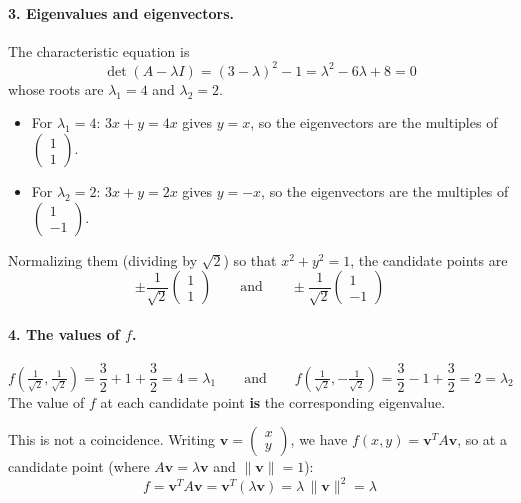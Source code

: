 \documentclass[]{article}
\begin{document}
	\paragraph{3. Eigenvalues and eigenvectors.}
	The characteristic equation is
	$$
	\det(A - \lambda I) = (3-\lambda)^2 - 1 = \lambda^2 - 6\lambda + 8 = 0
	$$
	whose roots are $\lambda_1 = 4$ and $\lambda_2 = 2$.
	\begin{itemize}
		\item For $\lambda_1 = 4$: $3x + y = 4x$ gives $y = x$, so the eigenvectors are the multiples of $\begin{pmatrix} 1 \\ 1 \end{pmatrix}$.
		\item For $\lambda_2 = 2$: $3x + y = 2x$ gives $y = -x$, so the eigenvectors are the multiples of $\begin{pmatrix} 1 \\ -1 \end{pmatrix}$.
	\end{itemize}
	Normalizing them (dividing by $\sqrt{2}$) so that $x^2 + y^2 = 1$, the candidate points are
	$$
	\pm\frac{1}{\sqrt{2}}\begin{pmatrix} 1 \\ 1 \end{pmatrix}
	\qquad \text{and} \qquad
	\pm\frac{1}{\sqrt{2}}\begin{pmatrix} 1 \\ -1 \end{pmatrix}
	$$

	\paragraph{4. The values of $f$.}
	$$
	f\left(\tfrac{1}{\sqrt{2}}, \tfrac{1}{\sqrt{2}}\right) = \frac{3}{2} + 1 + \frac{3}{2} = 4 = \lambda_1
	\qquad \text{and} \qquad
	f\left(\tfrac{1}{\sqrt{2}}, -\tfrac{1}{\sqrt{2}}\right) = \frac{3}{2} - 1 + \frac{3}{2} = 2 = \lambda_2
	$$
	The value of $f$ at each candidate point \textbf{is} the corresponding eigenvalue.

	This is not a coincidence.
	Writing $\mathbf{v} = \begin{pmatrix} x \\ y \end{pmatrix}$, we have $f(x,y) = \mathbf{v}^T A \mathbf{v}$, so at a candidate point (where $A\mathbf{v} = \lambda \mathbf{v}$ and $\|\mathbf{v}\| = 1$):
	$$
	f = \mathbf{v}^T A \mathbf{v} = \mathbf{v}^T (\lambda \mathbf{v}) = \lambda \, \|\mathbf{v}\|^2 = \lambda
	$$
\end{document}
